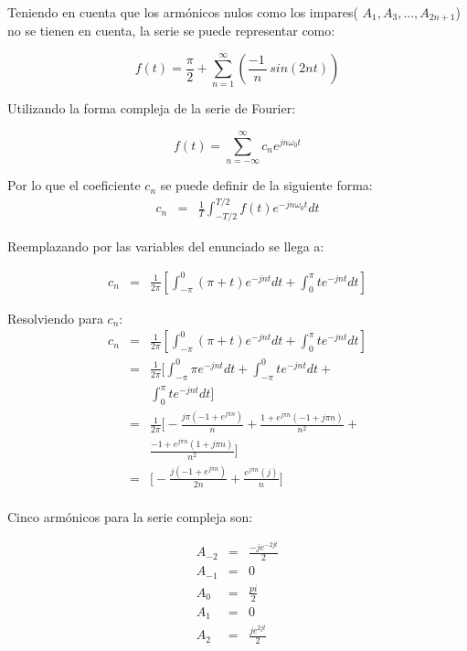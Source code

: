 \documentclass[twocolumn]{article}
\begin{document}
Teniendo en cuenta que los armónicos nulos como los impares( $A_1 , A_3,..., A_{2n+1}$) no se tienen en cuenta, la serie se puede representar como:

$$f(t) = \frac{\pi}{2} + \sum_{n=1}^\infty\left( \frac{ -1 \,}{n} \,sin(2 n t) \right)$$


Utilizando la forma compleja de la serie de Fourier:


$$f(t) =  \sum_{n=-\infty}^\infty c_n e^{jn\omega_0t} $$


Por lo que el coeficiente $c_n$ se puede definir de la siguiente forma:
\begin{eqnarray*}
c_n &=& \frac{1}{T}\int_{-T/2}^{T/2}f(t)e^{-jn\omega_0t}dt
\end{eqnarray*}

Reemplazando por las variables del enunciado se llega a:

\begin{eqnarray*}
c_n &=& \frac{1}{2\pi} \left [ \int_{-\pi}^{0}(\pi+t) e^{-jnt}dt + \int_{0}^{\pi}t e^{-jnt}dt \right]
\end{eqnarray*}

Resolviendo para $c_n$:
\begin{eqnarray*}
c_n &=& \frac{1}{2\pi} \left [ \int_{-\pi}^{0}(\pi+t) e^{-jnt}dt + \int_{0}^{\pi}t e^{-jnt}dt \right]\\
&=& \frac{1}{2\pi} \bigg [ \int_{-\pi}^{0}\pi e^{-jnt}dt + \int_{-\pi}^{0}t e^{-jnt}dt + \\
& &  \int_{0}^{\pi}t e^{-jnt}dt \bigg] \\
&=& \frac{1}{2\pi} \bigg [ -\frac{j \pi (-1 + e^{j \pi n})}{n} + \frac{1+e^{j \pi n}(-1 + j \pi n)}{n^2} + \\
& &  \frac{-1+e^{j \pi n}(1 + j \pi n)}{n^2} \bigg] \\
&=& \bigg [ -\frac{j (-1 + e^{j \pi n})}{2n} + \frac{e^{j \pi n}(j)}{ n} \bigg]\\
\end{eqnarray*}

Cinco armónicos para la serie compleja son:

\begin{eqnarray*}
A_{-2} &=& \frac{-j e^{-2 j t}}{2} \\
A_{-1} &=& 0 \\
A_0 &=& \frac{pi}{2} \\
A_1 &=& 0 \\
A_2 &=& \frac{j e^{2 j t}}{2} \\
\end{eqnarray*}
\end{document}
